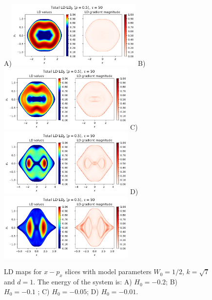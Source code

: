 \documentclass[10pt,aps,onecolumn,superscriptaddress]{revtex4-2}
\begin{document}
\begin{figure}
    \centering
    A)\includegraphics[width=0.6\textwidth]{LD_H0_-0_2_x-px_PES_bifurcation.png}
    B)\includegraphics[width=0.6\textwidth]{LD_H0_-0_1_x-px_PES_bifurcation.png}
    C)\includegraphics[width=0.6\textwidth]{LD_H0_-0_05_x-px_PES_bifurcation.png}
    D)\includegraphics[width=0.6\textwidth]{LD_H0_-0_01_x-px_PES_bifurcation.png}
    \caption{LD maps for $x-p_x$ slices with model parameters $W_0 = 1/2$, $k = \sqrt{7}$ and $d = 1$. The energy of the system is: A) $H_0 = -0.2$; B) $H_0 = -0.1$ ; C) $H_0 = -0.05$; D) $H_0 = -0.01$.}
\end{figure}
\end{document}
